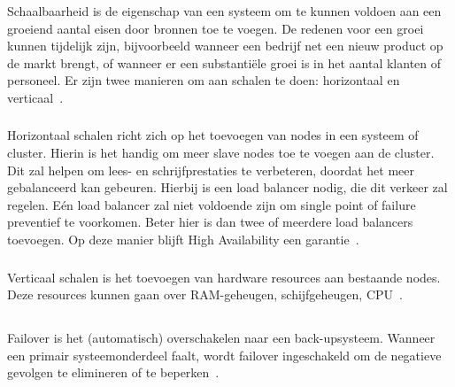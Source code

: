 Schaalbaarheid is de eigenschap van een systeem om te kunnen voldoen aan een groeiend aantal eisen door bronnen toe te voegen. De redenen voor een groei kunnen tijdelijk zijn, bijvoorbeeld wanneer een bedrijf net een nieuw product op de markt brengt, of wanneer er een substantiële groei is in het aantal klanten of personeel. Er zijn twee manieren om aan schalen te doen: horizontaal en verticaal~\autocite{Insausti2019}.

\subsubsection{}
\label{subsubsec:Horizontaal schalen}
Horizontaal schalen richt zich op het toevoegen van nodes in een systeem of cluster. Hierin is het handig om meer slave nodes toe te voegen aan de cluster. Dit zal helpen om lees- en schrijfprestaties te verbeteren, doordat het meer gebalanceerd kan gebeuren. Hierbij is een load balancer nodig, die dit verkeer zal regelen. Eén load balancer zal niet voldoende zijn om single point of failure preventief te voorkomen. Beter hier is dan twee of meerdere load balancers toevoegen. Op deze manier blijft High Availability een garantie~\autocite{Insausti2019}.

\subsubsection{}
\label{subsubsec:Verticaal schalen}
Verticaal schalen is het toevoegen van hardware resources aan bestaande nodes. Deze resources kunnen gaan over RAM-geheugen, schijfgeheugen, CPU~\autocite{Insausti2019}.

\subsection{}
\label{subsec:Failover}

Failover is het (automatisch) overschakelen naar een back-upsysteem. Wanneer een primair systeemonderdeel faalt, wordt failover ingeschakeld om de negatieve gevolgen te elimineren of te beperken~\autocite{AVINetworks2020}.

\subsection{}
\label{subsec:Failback}

